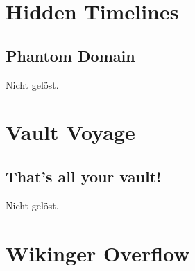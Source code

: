 \documentclass[12pt, a4paper, titlepage, oneside]{scrartcl}
\begin{document}
	\section{Hidden Timelines}

	\subsection{Phantom Domain}
	Nicht gelöst.

	\section{Vault Voyage}

	\subsection{That's all your vault!}
	Nicht gelöst.

	\section{Wikinger Overflow}
\end{document}

